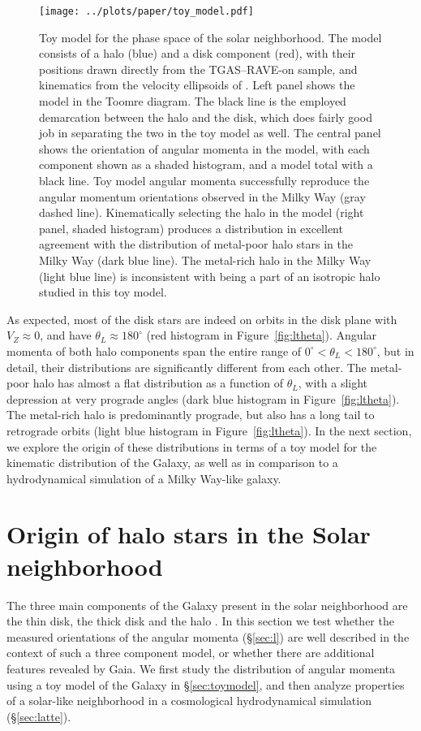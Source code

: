 \documentclass[apj, twocolappendix, numberedappendix, appendixfloats]{emulateapj}
\begin{document}
\begin{figure*}
\begin{center}
\texttt{[image: ../plots/paper/toy\_model.pdf]}
\caption{Toy model for the phase space of the solar neighborhood.
The model consists of a halo (blue) and a disk component (red), with their positions drawn directly from the TGAS--RAVE-on sample, and kinematics from the velocity ellipsoids of \citet{bensby2003}.
Left panel shows the model in the Toomre diagram.
The black line is the employed demarcation between the halo and the disk, which does fairly good job in separating the two in the toy model as well.
The central panel shows the orientation of angular momenta in the model, with each component shown as a shaded histogram, and a model total with a black line.
Toy model angular momenta successfully reproduce the angular momentum orientations observed in the Milky Way (gray dashed line).
Kinematically selecting the halo in the model (right panel, shaded histogram) produces a distribution in excellent agreement with the distribution of metal-poor halo stars in the Milky Way (dark blue line).
The metal-rich halo in the Milky Way (light blue line) is inconsistent with being a part of an isotropic halo studied in this toy model.}
\label{fig:toy}
\end{center}
\end{figure*}

As expected, most of the disk stars are indeed on orbits in the disk plane with $V_Z\approx0$, and have $\theta_L\approx180^\circ$ (red histogram in Figure~\ref{fig:ltheta}).
Angular momenta of both halo components span the entire range of $0^\circ<\theta_L<180^\circ$, but in detail, their distributions are significantly different from each other.
The metal-poor halo has almost a flat distribution as a function of $\theta_L$, with a slight depression at very prograde angles (dark blue histogram in Figure~\ref{fig:ltheta}).
The metal-rich halo is predominantly prograde, but also has a long tail to retrograde orbits (light blue histogram in Figure~\ref{fig:ltheta}).
In the next section, we explore the origin of these distributions in terms of a toy model for the kinematic distribution of the Galaxy, as well as in comparison to a hydrodynamical simulation of a Milky Way-like galaxy.

\section{Origin of halo stars in the Solar neighborhood}
The three main components of the Galaxy present in the solar neighborhood are the thin disk, the thick disk and the halo \citep[e.g.,][]{bhg2016}.
In this section we test whether the measured orientations of the angular momenta (\S\ref{sec:l}) are well described in the context of such a three component model, or whether there are additional features revealed by Gaia.
We first study the distribution of angular momenta using a toy model of the Galaxy in \S\ref{sec:toymodel}, and then analyze properties of a solar-like neighborhood in a cosmological hydrodynamical simulation (\S\ref{sec:latte}).
\end{document}
